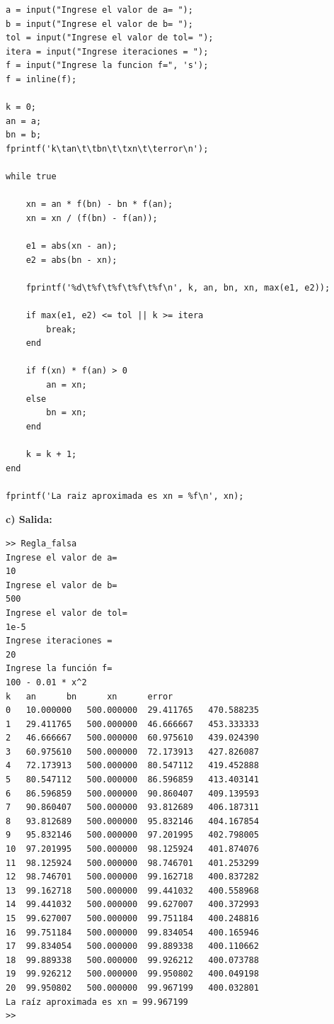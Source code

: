 \documentclass[12pt,a4paper,twoside]{article}  %
\begin{document}
\begin{lstlisting}
a = input("Ingrese el valor de a= ");
b = input("Ingrese el valor de b= ");
tol = input("Ingrese el valor de tol= ");
itera = input("Ingrese iteraciones = ");
f = input("Ingrese la funcion f=", 's');
f = inline(f);

k = 0; 
an = a;
bn = b;
fprintf('k\tan\t\tbn\t\txn\t\terror\n');

while true

    xn = an * f(bn) - bn * f(an);
    xn = xn / (f(bn) - f(an));
    
    e1 = abs(xn - an);
    e2 = abs(bn - xn);
    
    fprintf('%d\t%f\t%f\t%f\t%f\n', k, an, bn, xn, max(e1, e2));
    
    if max(e1, e2) <= tol || k >= itera
        break;
    end
    
    if f(xn) * f(an) > 0
        an = xn;
    else
        bn = xn;
    end
    
    k = k + 1;
end

fprintf('La raiz aproximada es xn = %f\n', xn);

\end{lstlisting}

\textbf{c) Salida:}

\begin{verbatim}
>> Regla_falsa
Ingrese el valor de a= 
10
Ingrese el valor de b= 
500
Ingrese el valor de tol= 
1e-5
Ingrese iteraciones = 
20
Ingrese la función f=
100 - 0.01 * x^2
k	an		bn		xn		error
0	10.000000	500.000000	29.411765	470.588235
1	29.411765	500.000000	46.666667	453.333333
2	46.666667	500.000000	60.975610	439.024390
3	60.975610	500.000000	72.173913	427.826087
4	72.173913	500.000000	80.547112	419.452888
5	80.547112	500.000000	86.596859	413.403141
6	86.596859	500.000000	90.860407	409.139593
7	90.860407	500.000000	93.812689	406.187311
8	93.812689	500.000000	95.832146	404.167854
9	95.832146	500.000000	97.201995	402.798005
10	97.201995	500.000000	98.125924	401.874076
11	98.125924	500.000000	98.746701	401.253299
12	98.746701	500.000000	99.162718	400.837282
13	99.162718	500.000000	99.441032	400.558968
14	99.441032	500.000000	99.627007	400.372993
15	99.627007	500.000000	99.751184	400.248816
16	99.751184	500.000000	99.834054	400.165946
17	99.834054	500.000000	99.889338	400.110662
18	99.889338	500.000000	99.926212	400.073788
19	99.926212	500.000000	99.950802	400.049198
20	99.950802	500.000000	99.967199	400.032801
La raíz aproximada es xn = 99.967199
>>  

\end{verbatim}
\end{document}
